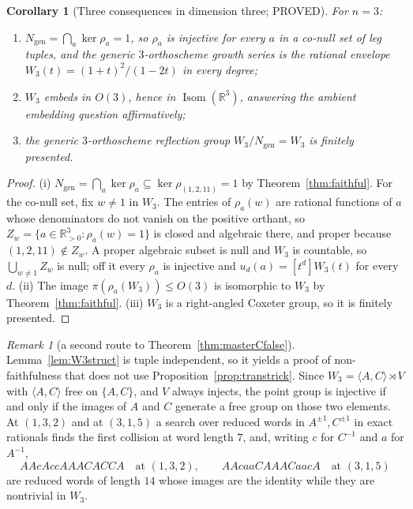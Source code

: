 \documentclass[11pt]{article}
\newtheorem{corollary}[theorem]{Corollary}
\theoremstyle{definition}
\theoremstyle{remark}
\newtheorem{remark}[theorem]{Remark}
\theoremstyle{definition}
\newcommand{\R}{\mathbb{R}}
\newcommand{\Isom}{\operatorname{Isom}}
\begin{document}
\begin{corollary}[Three consequences in dimension three; PROVED]\label{cor:three}
For $n=3$:
\begin{enumerate}[label=(\roman*),leftmargin=2.2em]
\item $N_{\mathrm{gen}}=\bigcap_a\ker\rho_a=1$, so $\rho_a$ is injective for every $a$ in a
co-null set of leg tuples, and the generic $3$-orthoscheme growth series is the rational envelope
$W_3(t)=(1+t)^2/(1-2t)$ in every degree;
\item $W_3$ embeds in $O(3)$, hence in $\Isom(\R^3)$, answering the ambient embedding question
affirmatively;
\item the generic $3$-orthoscheme reflection group $W_3/N_{\mathrm{gen}}=W_3$ is finitely
presented.
\end{enumerate}
\end{corollary}

\begin{proof}
(i) $N_{\mathrm{gen}}=\bigcap_a\ker\rho_a\subseteq\ker\rho_{(1,2,11)}=1$ by
Theorem~\ref{thm:faithful}. For the co-null set, fix $w\ne1$ in $W_3$. The entries of
$\rho_a(w)$ are rational functions of $a$ whose denominators do not vanish on the positive
orthant, so $Z_w=\{a\in\R_{>0}^3:\rho_a(w)=1\}$ is closed and algebraic there, and proper
because $(1,2,11)\notin Z_w$. A proper algebraic subset is null and $W_3$ is countable, so
$\bigcup_{w\ne1}Z_w$ is null; off it every $\rho_a$ is injective and $u_d(a)=[t^d]W_3(t)$ for
every $d$. (ii) The image
$\pi(\rho_a(W_3))\le O(3)$ is isomorphic to $W_3$ by Theorem~\ref{thm:faithful}. (iii) $W_3$ is a
right-angled Coxeter group, so it is finitely presented.
\end{proof}

\begin{remark}[a second route to Theorem~\textup{\ref{thm:masterCfalse}}]\label{rem:secondroute}
Lemma~\ref{lem:W3struct} is tuple independent, so it yields a proof of non-faithfulness that does
not use Proposition~\ref{prop:transtrick}. Since $W_3=\langle A,C\rangle\rtimes V$ with
$\langle A,C\rangle$ free on $\{A,C\}$, and $V$ always injects, the point group is injective if
and only if the images of $A$ and $C$ generate a free group on those two elements. At $(1,3,2)$
and at $(3,1,5)$ a search over reduced words in $A^{\pm1},C^{\pm1}$ in exact rationals finds the
first collision at word length $7$, and, writing $c$ for $C^{-1}$ and $a$ for $A^{-1}$,
\[
 AAcAccAAACACCA \quad\text{at }(1,3,2),\qquad AAcaaCAAACaacA \quad\text{at }(3,1,5)
\]
are reduced words of length $14$ whose images are the identity while they are nontrivial in $W_3$.
\end{remark}
\end{document}
